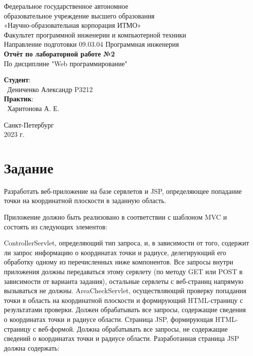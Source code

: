 \documentclass{article}
\begin{document}
\begin{center}
    \Large
    Федеральное государственное автономное \\
    образовательное учреждение высшего образования \\ 
    «Научно-образовательная корпорация ИТМО»\\
    \vspace{0.5cm}
    \large
    Факультет программной инженерии и компьютерной техники \\
    Направление подготовки 09.03.04 Программная инженерия \\
    \vspace{1cm}
    \Large
    \textbf{Отчёт по лабораторной работе №2} \\
    По дисциплине "Web программирование" \\
    \large
    \vspace{8cm}

    \begin{minipage}{.33\textwidth}
    \end{minipage}
    \hfill
    \begin{minipage}{.4\textwidth}
    
        \textbf{Студент}: \vspace{.1cm} \\
        \ Дениченко Александр P3212\\
        \textbf{Практик}:  \\
        \ Харитонова А. Е.
    \end{minipage}
    \vfill
Санкт-Петербург\\ 2023 г.
\end{center}

\newpage

\section{Задание}
Разработать веб-приложение на базе сервлетов и JSP, определяющее попадание точки на координатной плоскости в заданную область.

Приложение должно быть реализовано в соответствии с шаблоном MVC и состоять из следующих элементов:

ControllerServlet, определяющий тип запроса, и, в зависимости от того, содержит ли запрос информацию о координатах точки и радиусе, делегирующий его обработку одному из перечисленных ниже компонентов. Все запросы внутри приложения должны передаваться этому сервлету (по методу GET или POST в зависимости от варианта задания), остальные сервлеты с веб-страниц напрямую вызываться не должны.
AreaCheckServlet, осуществляющий проверку попадания точки в область на координатной плоскости и формирующий HTML-страницу с результатами проверки. Должен обрабатывать все запросы, содержащие сведения о координатах точки и радиусе области.
Страница JSP, формирующая HTML-страницу с веб-формой. Должна обрабатывать все запросы, не содержащие сведений о координатах точки и радиусе области.
Разработанная страница JSP должна содержать:
\end{document}
